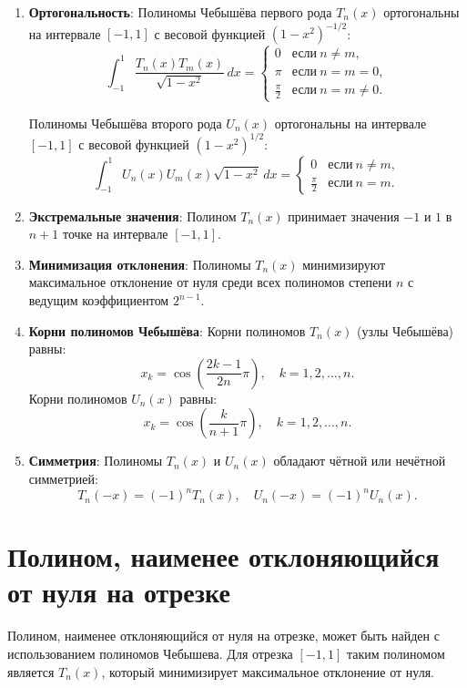 \documentclass{article}
\begin{document}
\begin{enumerate}
    \item \textbf{Ортогональность}:
    Полиномы Чебышёва первого рода \( T_n(x) \) ортогональны на интервале \([-1, 1]\) с весовой функцией \((1 - x^2)^{-1/2}\):
    \[
    \int_{-1}^{1} \frac{T_n(x) T_m(x)}{\sqrt{1 - x^2}} \, dx = 
    \begin{cases} 
    0 & \text{если} \ n \neq m, \\
    \pi & \text{если} \ n = m = 0, \\
    \frac{\pi}{2} & \text{если} \ n = m \neq 0.
    \end{cases}
    \]

    Полиномы Чебышёва второго рода \( U_n(x) \) ортогональны на интервале \([-1, 1]\) с весовой функцией \((1 - x^2)^{1/2}\):
    \[
    \int_{-1}^{1} U_n(x) U_m(x) \sqrt{1 - x^2} \, dx = 
    \begin{cases} 
    0 & \text{если} \ n \neq m, \\
    \frac{\pi}{2} & \text{если} \ n = m.
    \end{cases}
    \]

    \item \textbf{Экстремальные значения}:
    Полином \( T_n(x) \) принимает значения \(-1\) и \(1\) в \(n+1\) точке на интервале \([-1, 1]\).

    \item \textbf{Минимизация отклонения}:
    Полиномы \( T_n(x) \) минимизируют максимальное отклонение от нуля среди всех полиномов степени \( n \) с ведущим коэффициентом \( 2^{n-1} \).

    \item \textbf{Корни полиномов Чебышёва}:
    Корни полиномов \( T_n(x) \) (узлы Чебышёва) равны:
    \[
    x_k = \cos\left(\frac{2k-1}{2n}\pi\right), \quad k = 1, 2, \ldots, n.
    \]
    Корни полиномов \( U_n(x) \) равны:
    \[
    x_k = \cos\left(\frac{k}{n+1}\pi\right), \quad k = 1, 2, \ldots, n.
    \]

    \item \textbf{Симметрия}:
    Полиномы \( T_n(x) \) и \( U_n(x) \) обладают чётной или нечётной симметрией:
    \[
    T_n(-x) = (-1)^n T_n(x), \quad U_n(-x) = (-1)^n U_n(x).
    \]
\end{enumerate}

\section{Полином, наименее отклоняющийся от нуля на отрезке}
Полином, наименее отклоняющийся от нуля на отрезке, может быть найден с использованием полиномов Чебышева. Для отрезка $[-1, 1]$ таким полиномом является $T_n(x)$, который минимизирует максимальное отклонение от нуля.
\end{document}
